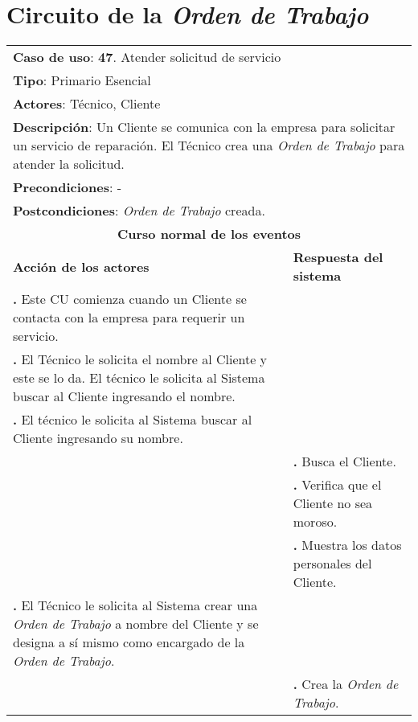 \documentclass[12pt]{extarticle}
\begin{document}
    \newcommand\inc{\stepcounter{step}\textbf{\thestep. }}
    \newcommand\resetinc{\setcounter{step}{0}}
    
    \newcommand\raya{\noindent\rule{169mm}{0.8mm}\\}

    \newcommand\OT{\textit{Orden de Trabajo}}
    \newcommand\OTs{\textit{Órdenes de Trabajo}}
    \section{ Circuito de la \OT{} }

\begin{longtable}{ |p{8cm}|p{8cm}| }
    \hline
    \multicolumn{2}{|p{16cm}|}{\textbf{Caso de uso}: \textbf{47}. Atender solicitud de servicio}\\
    \multicolumn{2}{|p{16cm}|}{\textbf{Tipo}: Primario Esencial}\\
    \multicolumn{2}{|p{16cm}|}{\textbf{Actores}: Técnico, Cliente}\\
    \multicolumn{2}{|p{16cm}|}{\textbf{Descripción}: Un Cliente se comunica con la empresa para solicitar un servicio de reparación. El Técnico crea una \OT{} para atender la solicitud.}\\
    \multicolumn{2}{|p{16cm}|}{\textbf{Precondiciones}: -}\\
    \multicolumn{2}{|p{16cm}|}{\textbf{Postcondiciones}: \OT{} creada.}\\
    \hline
    \multicolumn{2}{|c|}{\textbf{Curso normal de los eventos}}\\
    \hline
    \textbf{Acción de los actores} & \textbf{Respuesta del sistema}\\
    \hline
        \inc Este CU comienza cuando un Cliente se contacta con la empresa para requerir un servicio.&\\
        \hline
        \inc El Técnico le solicita el nombre al Cliente y este se lo da. El técnico le solicita al Sistema buscar al Cliente ingresando el nombre.& \\
        \hline
        \inc El técnico le solicita al Sistema buscar al Cliente ingresando su nombre.& \\
        \hline
        & \inc Busca el Cliente.\\
        \hline


        & \inc Verifica que el Cliente no sea moroso.\\
        \hline
        & \inc Muestra los datos personales del Cliente.\\
        \hline
        \inc El Técnico le solicita al Sistema crear una \OT{} a nombre del Cliente y se designa a sí mismo como encargado de la \OT{}.& \\
        \hline
        & \inc Crea la \OT{}.\\
        \hline



\end{longtable}
\end{document}
